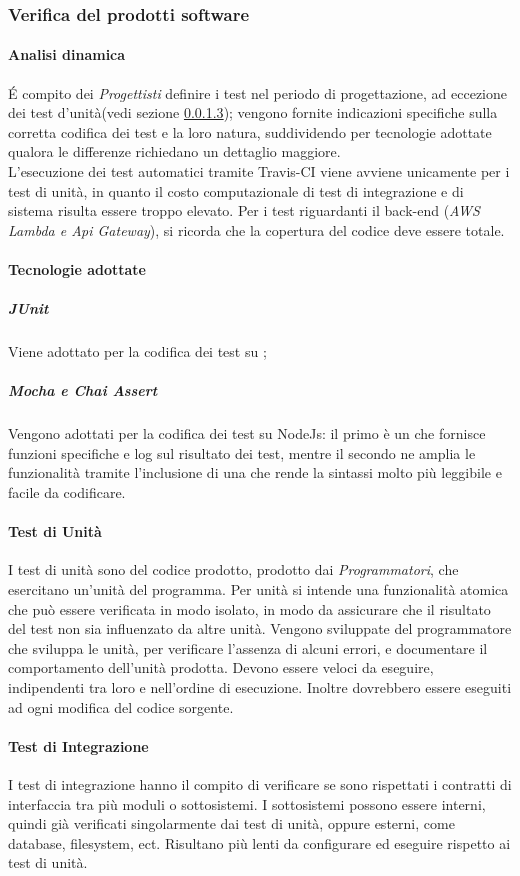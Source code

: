 \subsubsection{Verifica del prodotti software}
\paragraph{Analisi dinamica}\label{anDinamica}
\'E compito dei \textit{Progettisti} definire i test nel periodo di progettazione, ad eccezione dei test d'unità(vedi sezione \ref{tunita}); vengono fornite indicazioni specifiche sulla corretta codifica dei test e la loro natura, suddividendo per tecnologie adottate qualora le differenze richiedano un dettaglio maggiore.\\
L'esecuzione dei test automatici tramite Travis-CI viene avviene unicamente per i test di unità, in quanto il costo computazionale di test di integrazione e di sistema risulta essere troppo elevato.
Per i test riguardanti il back-end (\textit{AWS Lambda e Api Gateway}), si ricorda che la copertura del codice deve essere totale.
\paragraph{Tecnologie adottate}
\subparagraph{JUnit} Viene adottato per la codifica dei test su ;
\subparagraph{Mocha e Chai Assert} Vengono adottati per la codifica dei test su NodeJs: il primo è un  che fornisce funzioni specifiche e log sul risultato dei test, mentre il secondo ne amplia le funzionalità tramite l'inclusione di una  che rende la sintassi molto più leggibile e facile da codificare.

\paragraph{Test di Unità}\label{tunita}
I test di unità sono del codice prodotto, prodotto dai \textit{Programmatori}, che esercitano un'unità del programma. Per unità si intende una funzionalità atomica che può essere verificata in modo isolato, in modo da assicurare che il risultato del test non sia influenzato da altre unità. 
Vengono sviluppate del programmatore che sviluppa le unità, per verificare l'assenza di alcuni errori, e documentare il comportamento dell'unità prodotta. 
Devono essere veloci da eseguire, indipendenti tra loro e nell'ordine di esecuzione. Inoltre dovrebbero essere eseguiti ad ogni modifica del codice sorgente.
\paragraph{Test di Integrazione}
I test di integrazione hanno il compito di verificare se sono rispettati i contratti di interfaccia tra più moduli o sottosistemi. I sottosistemi possono essere interni, quindi già verificati singolarmente dai test di unità, oppure esterni, come database, filesystem, ect. 
Risultano più lenti da configurare ed eseguire rispetto ai test di unità.  
